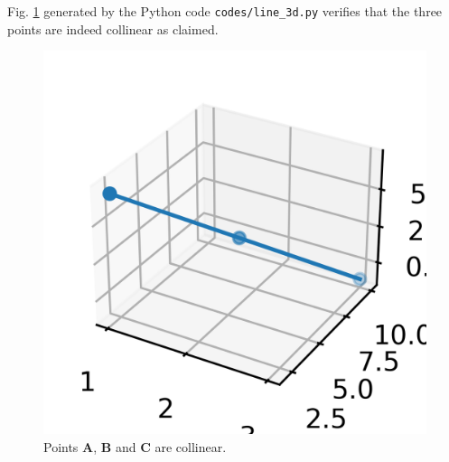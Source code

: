 \documentclass[journal,12pt,twocolumn]{IEEEtran}
\let\vec\mathbf
\begin{document}
\begin{enumerate}
    Fig. \ref{fig:3d-line} generated by the Python code 
    \texttt{codes/line\_3d.py} verifies that the three points are indeed 
    collinear as claimed.
    \begin{figure}[!ht]
        \centering
        \includegraphics[width=\columnwidth]{figs/line_3d.png}
        \caption{Points $\vec{A}$, $\vec{B}$ and $\vec{C}$ are collinear.}
        \label{fig:3d-line}
    \end{figure}
\end{enumerate}
\end{document}
